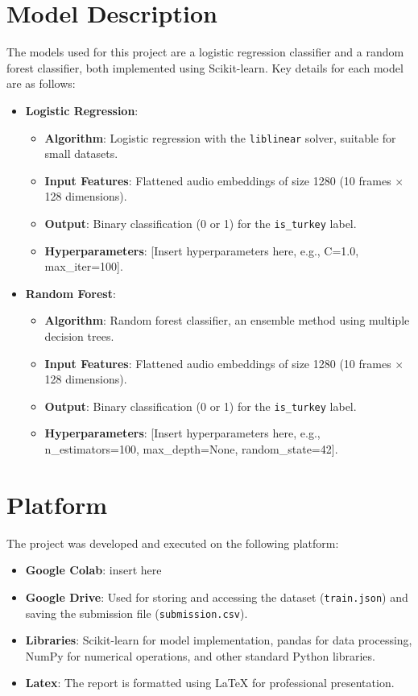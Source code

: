 \documentclass[12pt, a4paper]{article}
\begin{document}
\section{Model Description}
The models used for this project are a logistic regression classifier and a random forest classifier, both implemented using Scikit-learn. Key details for each model are as follows:

\begin{itemize}
    \item \textbf{Logistic Regression}:
        \begin{itemize}
            \item \textbf{Algorithm}: Logistic regression with the \texttt{liblinear} solver, suitable for small datasets.
            \item \textbf{Input Features}: Flattened audio embeddings of size 1280 (10 frames $\times$ 128 dimensions).
            \item \textbf{Output}: Binary classification (0 or 1) for the \texttt{is\_turkey} label.
            \item \textbf{Hyperparameters}: [Insert hyperparameters here, e.g., C=1.0, max\_iter=100].
        \end{itemize}
    \item \textbf{Random Forest}:
        \begin{itemize}
            \item \textbf{Algorithm}: Random forest classifier, an ensemble method using multiple decision trees.
            \item \textbf{Input Features}: Flattened audio embeddings of size 1280 (10 frames $\times$ 128 dimensions).
            \item \textbf{Output}: Binary classification (0 or 1) for the \texttt{is\_turkey} label.
            \item \textbf{Hyperparameters}: [Insert hyperparameters here, e.g., n\_estimators=100, max\_depth=None, random\_state=42].
        \end{itemize}
\end{itemize}

\section{Platform}
The project was developed and executed on the following platform:

\begin{itemize}
    \item \textbf{Google Colab}: insert here
    \item \textbf{Google Drive}: Used for storing and accessing the dataset (\texttt{train.json}) and saving the submission file (\texttt{submission.csv}).
    \item \textbf{Libraries}: Scikit-learn for model implementation, pandas for data processing, NumPy for numerical operations, and other standard Python libraries.
    \item \textbf{Latex}: The report is formatted using LaTeX for professional presentation.
\end{itemize}
\end{document}
